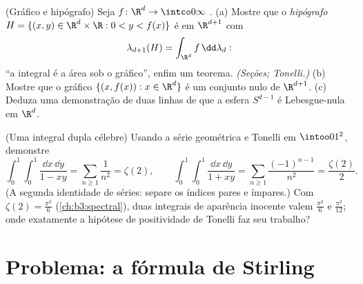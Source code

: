 \begin{exercise}[$\star\star$]\label{exo:b3:product:11}
(Gráfico e hipógrafo) Seja $f \colon \R^d \to \intco0\infty$ .
(a) Mostre que o \emph{hipógrafo} $H = \{(x, y) \in
\R^d\times\R : 0 < y < f(x)\}$ é  em $\R^{d+1}$ com
\[
\lambda_{d+1}(H) = \int_{\R^d}f\,\dd\lambda_d :
\]
``a integral é a área sob o gráfico'', enfim um teorema. \emph{(Seções;
Tonelli.)}
(b) Mostre que o gráfico $\{(x, f(x)) : x \in \R^d\}$ é um conjunto nulo de $\R^{d+1}$.
(c) Deduza uma demonstração de duas linhas de que a esfera $S^{d-1}$ é
Lebesgue-nula em $\R^d$.
\end{exercise}

\begin{exercise}[$\star\star$]\label{exo:b3:product:12}
(Uma integral dupla célebre) Usando a série geométrica e Tonelli em
$\intoo01^2$, demonstre
\[
\int_0^1\!\!\int_0^1\frac{\dd x\,\dd y}{1 - xy}
= \sum_{n\geq1}\frac1{n^2} = \zeta(2),
\qquad
\int_0^1\!\!\int_0^1\frac{\dd x\,\dd y}{1 + xy}
= \sum_{n\geq1}\frac{(-1)^{n-1}}{n^2} = \frac{\zeta(2)}2 .
\]
(A segunda identidade de séries: separe os índices pares e ímpares.)
Com $\zeta(2) = \frac{\pi^2}6$ (\cref{ch:b3:spectral}), duas integrais de aparência inocente valem
$\frac{\pi^2}6$ e $\frac{\pi^2}{12}$; onde exatamente a hipótese de positividade de Tonelli faz
seu trabalho?
\end{exercise}

\section{Problema: a fórmula de Stirling}

